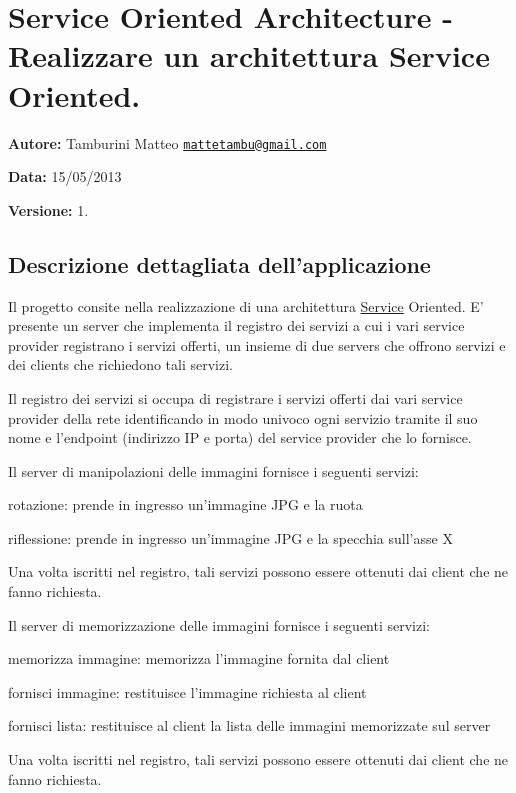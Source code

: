 \hypertarget{index_SOA}{}\section{Service Oriented Architecture -\/ Realizzare un architettura Service Oriented.}\label{index_SOA}
{\bfseries Autore\-:} Tamburini Matteo \href{mailto:mattetambu@gmail.com}{\tt mattetambu@gmail.\-com} \par
 {\bfseries Data\-:} 15/05/2013 \par
 {\bfseries Versione\-:} 1. \par
 \par
\hypertarget{index_Descrizione}{}\subsection{Descrizione dettagliata dell'applicazione}\label{index_Descrizione}
Il progetto consite nella realizzazione di una architettura \hyperlink{class_service}{Service} Oriented. E' presente un server che implementa il registro dei servizi a cui i vari service provider registrano i servizi offerti, un insieme di due servers che offrono servizi e dei clients che richiedono tali servizi.

Il registro dei servizi si occupa di registrare i servizi offerti dai vari service provider della rete identificando in modo univoco ogni servizio tramite il suo nome e l'endpoint (indirizzo I\-P e porta) del service provider che lo fornisce.

Il server di manipolazioni delle immagini fornisce i seguenti servizi\-:
\begin{DoxyItemize}
\item rotazione\-: prende in ingresso un'immagine J\-P\-G e la ruota
\item riflessione\-: prende in ingresso un'immagine J\-P\-G e la specchia sull'asse X \par
 Una volta iscritti nel registro, tali servizi possono essere ottenuti dai client che ne fanno richiesta. \par

\end{DoxyItemize}

Il server di memorizzazione delle immagini fornisce i seguenti servizi\-:
\begin{DoxyItemize}
\item memorizza immagine\-: memorizza l'immagine fornita dal client
\item fornisci immagine\-: restituisce l’immagine richiesta al client
\item fornisci lista\-: restituisce al client la lista delle immagini memorizzate sul server \par
 Una volta iscritti nel registro, tali servizi possono essere ottenuti dai client che ne fanno richiesta. \par

\end{DoxyItemize}

